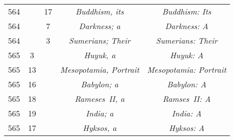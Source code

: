 \documentclass[a4paper,11pt]{article}
\begin{document}
\begin{center}
\begin{tabular}{|c|c|c|c|c|}
    564 & & 17 & \textit{Buddhism, its} & \textit{Buddhism: Its} \\
    564 & & \hphantom{0}7 & \textit{Darkness; a} & \textit{Darkness: A} \\
    564 & & \hphantom{0}3 & \textit{Sumerians; Their}
    & \textit{Sumerians: Their} \\
    565 & \hphantom{0}3 & & \textit{Huyuk, a} & \textit{Huyuk: A} \\
    565 & 13 & & \textit{Mesopotamia, Portrait}
           & \textit{Mesopotamia: Portrait} \\
    565 & 16 & & \textit{Babylon; a} & \textit{Babylon: A} \\
    565 & 18 & & \textit{Rameses~II, a} & \textit{Ramses~II: A} \\
    565 & 19 & & \textit{India; a} & \textit{India: A} \\
    565 & 17 & & \textit{Hyksos, a} & \textit{Hyksos: A} \\
    \hline
  \end{tabular}





  \newpage


\end{center}
\end{document}
